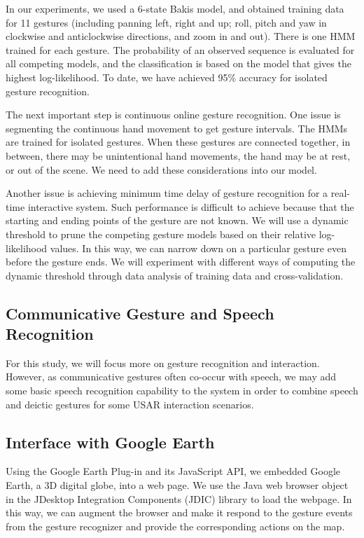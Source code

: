 In our experiments, we used a 6-state Bakis model, and obtained training data for 11 gestures (including panning left, right and up; roll, pitch and yaw in clockwise and anticlockwise directions, and zoom in and out). There is one HMM trained for each gesture. The probability of an observed sequence is evaluated for all competing models, and the classification is based on the model that gives the highest log-likelihood. To date, we have achieved 95\% accuracy for isolated gesture recognition. 

The next important step is continuous online gesture recognition. One issue is segmenting the continuous hand movement to get gesture intervals. The HMMs are trained for isolated gestures. When these gestures are connected together, in between, there may be unintentional hand movements, the hand may be at rest, or out of the scene. We need to add these considerations into our model.

Another issue is achieving minimum time delay of gesture recognition for a real-time interactive system. Such performance is difficult to achieve because that the starting and ending points of the gesture are not known. We will use a dynamic threshold to prune the competing gesture models based on their relative log-likelihood values. In this way, we can narrow down on a particular gesture even before the gesture ends. We will experiment with different ways of computing the dynamic threshold through data analysis of training data and cross-validation.
 
\subsection{Communicative Gesture and Speech Recognition} 
For this study, we will focus more on gesture recognition and interaction. However, as communicative gestures often co-occur with speech, we may add some basic speech recognition capability to the system in order to combine speech and deictic gestures for some USAR interaction scenarios.

\subsection{Interface with Google Earth}
Using the Google Earth Plug-in and its JavaScript API,  we embedded Google Earth, a 3D digital globe, into a web page. We use the Java web browser object in the JDesktop Integration Components (JDIC) library to load the webpage. In this way, we can augment the browser and make it respond to the gesture events from the gesture recognizer and provide the corresponding actions on the map. 

